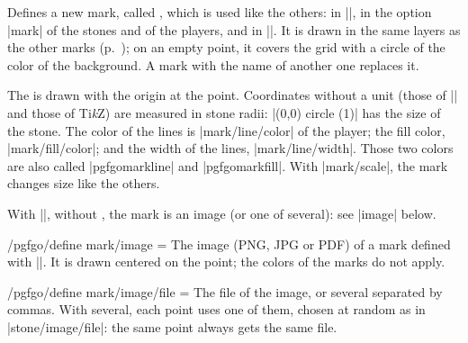 \label{subsec:marcaspropias}\begin{command}{\pgfgodefinemark{}}
	Defines a new mark, called , which is used like the others: in |\marks|, in the option |mark| of the stones and of the players, and in |\territory|. It is drawn in the same layers as the other marks (p.~\pageref{subsec:capas}); on an empty point, it covers the grid with a circle of the color of the background. A mark with the name of another one replaces it.

	The  is drawn with the origin at the point. Coordinates without a unit (those of |\pgfpointxy| and those of Ti\emph{k}Z) are measured in stone radii: |(0,0) circle (1)| has the size of the stone. The color of the lines is |mark/line/color| of the player; the fill color, |mark/fill/color|; and the width of the lines, |mark/line/width|. Those two colors are also called |pgfgomarkline| and |pgfgomarkfill|. With |mark/scale|, the mark changes size like the others.

	With |\pgfgodefinemark[image = {file = |\meta{file list}|, width = |\meta{dimension}|}]|, without , the mark is an image (or one of several): see |image| below.

	\begin{codeexample}[]

		\begin{goban}[5, partial = B2:D4]
		\end{goban}
	\end{codeexample}
\end{command}

\begin{key}{/pgfgo/define mark/image = }
	The image (PNG, JPG or PDF) of a mark defined with |\pgfgodefinemark|. It is drawn centered on the point; the colors of the marks do not apply.
\end{key}

\begin{key}{/pgfgo/define mark/image/file = }
	The file of the image, or several separated by commas. With several, each point uses one of them, chosen at random as in |stone/image/file|: the same point always gets the same file.

	\begin{codeexample}[]

		\begin{goban}[5, partial = A1:E3]
		\end{goban}
	\end{codeexample}
\end{key}

